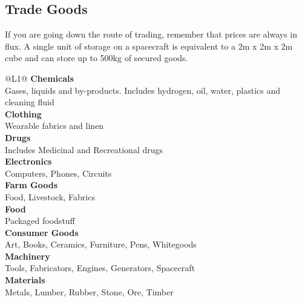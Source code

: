 \subsection{Trade Goods}

If you are going down the route of trading, remember that prices are always in flux. A single unit of storage on a spacecraft is equivalent to a 2m x 2m x 2m cube and can store up to 500kg of secured goods.

\begin{redtable}{\linewidth}{@{}L{1}@{}}
\textbf{Chemicals}\\
Gases, liquids and by-products. Includes hydrogen, oil, water, plastics and cleaning fluid\\
\textbf{Clothing}\\
Wearable fabrics and linen\\
\textbf{Drugs}\\
Includes Medicinal and Recreational drugs\\
\textbf{Electronics}\\
Computers, Phones, Circuits\\
\textbf{Farm Goods}\\
Food, Livestock, Fabrics\\
\textbf{Food}\\
Packaged foodstuff\\
\textbf{Consumer Goods}\\
Art, Books, Ceramics, Furniture, Pens,  Whitegoods\\
\textbf{Machinery}\\
Tools, Fabricators, Engines, Generators, Spacecraft\\
\textbf{Materials}\\
Metals, Lumber, Rubber, Stone, Ore, Timber\\
\end{redtable}
